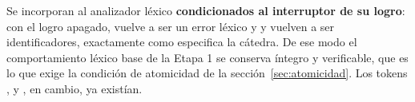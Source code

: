 Se incorporan al analizador léxico \textbf{condicionados al interruptor de su logro}: con el logro
apagado,  vuelve a ser un error léxico y  y  vuelven a ser
identificadores, exactamente como especifica la cátedra. De ese modo el comportamiento léxico base
de la Etapa 1 se conserva íntegro y verificable, que es lo que exige la condición de atomicidad de
la sección~\ref{sec:atomicidad}. Los tokens \tl{:}, \tl{++} y \tl{-{}-}, en cambio, ya existían.
